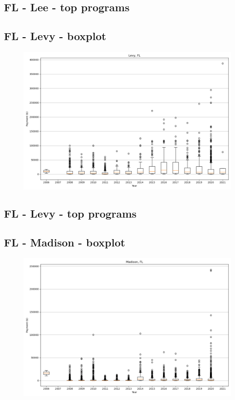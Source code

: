 \subsection*{FL - Lee - top programs}

\newpage
\subsection*{FL - Levy - boxplot}
\begin{figure}[h]
\centering
\includegraphics[width=7in]{../output/boxplots/counties/Levy-FL_boxplot.png}
\end{figure}


\subsection*{FL - Levy - top programs}

\newpage
\subsection*{FL - Madison - boxplot}
\begin{figure}[h]
\centering
\includegraphics[width=7in]{../output/boxplots/counties/Madison-FL_boxplot.png}
\end{figure}



